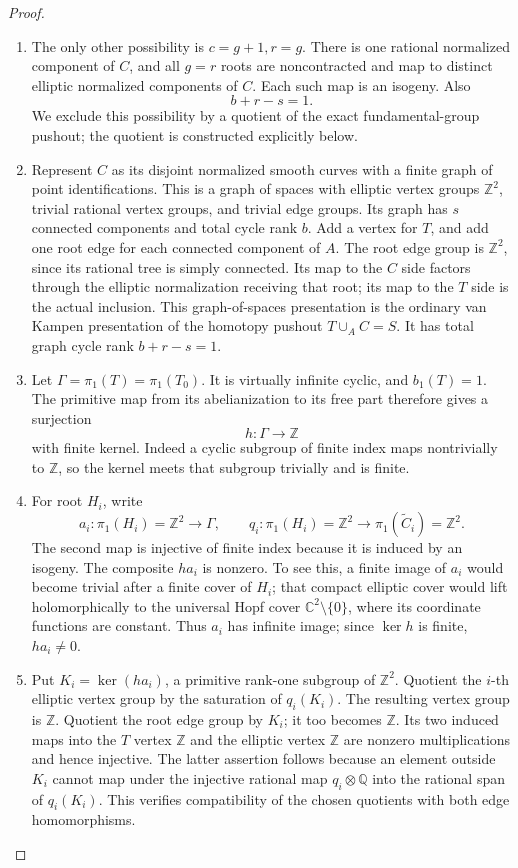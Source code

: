 \begin{proof}
\begin{enumerate}[label={$\langle1\rangle$\arabic*.},leftmargin=*]
\item The only other possibility is \(c=g+1,r=g\). There is one rational
normalized component of \(C\), and all \(g=r\) roots are noncontracted and
map to distinct elliptic normalized components of \(C\). Each such map is
an isogeny. Also
\[
 b+r-s=1.
\]
We exclude this possibility by a quotient of the exact fundamental-group
pushout; the quotient is constructed explicitly below.

\item Represent \(C\) as its disjoint normalized smooth curves with a finite
graph of point identifications. This is a graph of spaces with elliptic
vertex groups \(\mathbb Z^2\), trivial rational vertex groups, and trivial
edge groups. Its graph has \(s\) connected components and total cycle rank
\(b\). Add a vertex for \(T\), and add one root edge for each connected
component of \(A\). The root edge group is \(\mathbb Z^2\), since its
rational tree is simply connected. Its map to the \(C\) side factors
through the elliptic normalization receiving that root; its map to the
\(T\) side is the actual inclusion. This graph-of-spaces presentation is
the ordinary van Kampen presentation of the homotopy pushout
\(T\cup_A C=S\). It has total graph cycle rank \(b+r-s=1\).

\item Let \(\Gamma=\pi_1(T)=\pi_1(T_0)\). It is virtually infinite cyclic, and
\(b_1(T)=1\). The primitive map from its abelianization to its free part
therefore gives a surjection
\[
 h:\Gamma\longrightarrow\mathbb Z
\]
with finite kernel. Indeed a cyclic subgroup of finite index maps
nontrivially to \(\mathbb Z\), so the kernel meets that subgroup trivially
and is finite.

\item For root \(H_i\), write
\[
 a_i:\pi_1(H_i)=\mathbb Z^2\longrightarrow\Gamma,\qquad
 q_i:\pi_1(H_i)=\mathbb Z^2\longrightarrow
       \pi_1(\widetilde C_i)=\mathbb Z^2.
\]
The second map is injective of finite index because it is induced by an
isogeny. The composite \(h a_i\) is nonzero. To see this, a finite image
of \(a_i\) would become trivial after a finite cover of \(H_i\); that
compact elliptic cover would lift holomorphically to the universal Hopf
cover \(\mathbb C^2\setminus\{0\}\), where its coordinate functions are
constant. Thus \(a_i\) has infinite image; since \(\ker h\) is finite,
\(h a_i\ne0\).

\item Put \(K_i=\ker(h a_i)\), a primitive rank-one subgroup of
\(\mathbb Z^2\). Quotient the \(i\)-th elliptic vertex group by the
saturation of \(q_i(K_i)\). The resulting vertex group is \(\mathbb Z\).
Quotient the root edge group by \(K_i\); it too becomes \(\mathbb Z\).
Its two induced maps into the \(T\) vertex \(\mathbb Z\) and the elliptic
vertex \(\mathbb Z\) are nonzero multiplications and hence injective.
The latter assertion follows because an element outside \(K_i\) cannot
map under the injective rational map \(q_i\otimes\mathbb Q\) into the
rational span of \(q_i(K_i)\). This verifies compatibility of the chosen
quotients with both edge homomorphisms.


\end{enumerate}
\end{proof}
